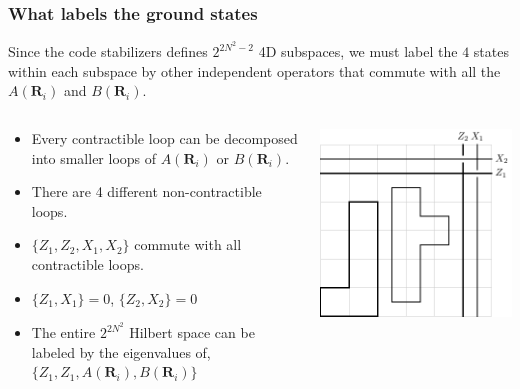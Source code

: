 \documentclass{beamer}
\renewcommand{\(}{\left(}
\renewcommand{\)}{\right)}
\renewcommand{\[}{\left[}
\renewcommand{\]}{\right]}
\begin{document}
\begin{frame}
    \frametitle{What labels the ground states}
    Since the code stabilizers defines $2^{2N^2-2}$ 4D subspaces, we must label the $4$ states within each subspace by  other independent operators that commute with all the $A(\bm R_i)$ and $B(\bm R_i)$. 
    \pause
    \begin{columns}
        \begin{column}{0.55\textwidth}
            \begin{itemize}
                \item Every contractible loop can be decomposed into smaller loops of $A(\bm R_i)$ or $B(\bm R_i)$. 
                \item There are 4 different non-contractible loops. 
                \item $\{Z_1, Z_2, X_1, X_2\}$ commute with all contractible loops. 
                \item $\{Z_1, X_1\} = 0 $, $\{Z_2, X_2\} = 0 $
                \item The entire $2^{2N^2}$ Hilbert space can be labeled by the eigenvalues of, $\{Z_1, Z_1, A(\bm R_i), B(\bm R_i)\}$
            \end{itemize}
        \end{column}
        \begin{column}{0.45\textwidth}
            \vspace{10pt}
            \centering
            \includegraphics[scale=0.7, trim=0 0 0 0,clip]{decomp_loops.pdf}
        \end{column}
    \end{columns}
    
\end{frame}
\end{document}

